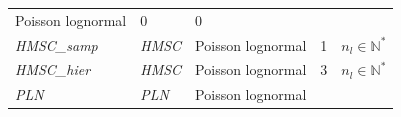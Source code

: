 \documentclass[12pt,]{article}
\begin{document}
{\begin{longtable}[]{@{}lllll@{}}
\begin{minipage}[t]{0.19\columnwidth}
Poisson lognormal\strut
\end{minipage} & \begin{minipage}[t]{0.24\columnwidth}\raggedright
0\strut
\end{minipage} & \begin{minipage}[t]{0.22\columnwidth}\raggedright
\(0\)\strut
\end{minipage}\tabularnewline
\begin{minipage}[t]{0.11\columnwidth}\raggedright
\emph{HMSC\_samp}\strut
\end{minipage} & \begin{minipage}[t]{0.09\columnwidth}\raggedright
\emph{HMSC}\strut
\end{minipage} & \begin{minipage}[t]{0.19\columnwidth}\raggedright
Poisson lognormal\strut
\end{minipage} & \begin{minipage}[t]{0.24\columnwidth}\raggedright
1\strut
\end{minipage} & \begin{minipage}[t]{0.22\columnwidth}\raggedright
\(n_l \in \mathbb{N}^*\)\strut
\end{minipage}\tabularnewline
\begin{minipage}[t]{0.11\columnwidth}\raggedright
\emph{HMSC\_hier}\strut
\end{minipage} & \begin{minipage}[t]{0.09\columnwidth}\raggedright
\emph{HMSC}\strut
\end{minipage} & \begin{minipage}[t]{0.19\columnwidth}\raggedright
Poisson lognormal\strut
\end{minipage} & \begin{minipage}[t]{0.24\columnwidth}\raggedright
3\strut
\end{minipage} & \begin{minipage}[t]{0.22\columnwidth}\raggedright
\(n_l \in \mathbb{N}^*\)\strut
\end{minipage}\tabularnewline
\begin{minipage}[t]{0.11\columnwidth}\raggedright
\emph{PLN}\strut
\end{minipage} & \begin{minipage}[t]{0.09\columnwidth}\raggedright
\emph{PLN}\strut
\end{minipage} & \begin{minipage}[t]{0.19\columnwidth}\raggedright
Poisson lognormal\strut
\end{minipage} & \begin{minipage}[t]{0.24\columnwidth}\raggedright

\end{minipage}
\end{longtable}}
\end{document}
